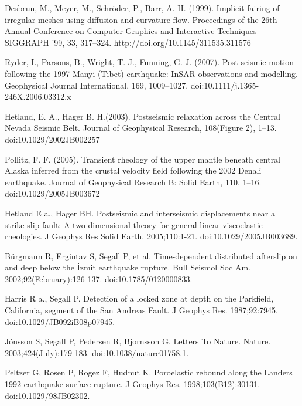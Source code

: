\documentclass[12pt]{article}
\begin{document}
\begin{thebibliography}{}

Desbrun, M., Meyer, M.,
  Schröder, P., Barr, A. H. (1999). Implicit fairing of irregular
  meshes using diffusion and curvature flow. Proceedings of the 26th
  Annual Conference on Computer Graphics and Interactive Techniques -
  SIGGRAPH ’99, 33, 317–324. http://doi.org/10.1145/311535.311576

Ryder, I., Parsons, B.,
  Wright, T. J., Funning, G. J. (2007). Post-seismic motion
  following the 1997 Manyi (Tibet) earthquake: InSAR observations and
  modelling. Geophysical Journal International, 169,
  1009–1027. doi:10.1111/j.1365-246X.2006.03312.x

Hetland, E. A.,
  Hager B. H.(2003). Postseismic relaxation across the Central Nevada
  Seismic Belt. Journal of Geophysical Research, 108(Figure 2),
  1–13. doi:10.1029/2002JB002257

Pollitz,
  F. F. (2005). Transient rheology of the upper mantle beneath central
  Alaska inferred from the crustal velocity field following the 2002
  Denali earthquake. Journal of Geophysical Research B: Solid Earth,
  110, 1–16. doi:10.1029/2005JB003672

 Hetland E a., Hager
  BH. Postseismic and interseismic displacements near a strike-slip
  fault: A two-dimensional theory for general linear viscoelastic
  rheologies. J Geophys Res Solid
  Earth. 2005;110:1-21. doi:10.1029/2005JB003689.

 B\"{u}rgmann R,
  Ergintav S, Segall P, et al. Time-dependent distributed afterslip on
  and deep below the İzmit earthquake rupture. Bull Seismol Soc
  Am. 2002;92(February):126-137. doi:10.1785/0120000833.

 Harris R a., Segall
  P. Detection of a locked zone at depth on the Parkfield, California,
  segment of the San Andreas Fault. J Geophys
  Res. 1987;92:7945. doi:10.1029/JB092iB08p07945.

 J\'onsson S, Segall P, Pedersen
  R, Bjornsson G. Letters To
  Nature. Nature. 2003;424(July):179-183. doi:10.1038/nature01758.1.

 Peltzer G, Rosen P,
  Rogez F, Hudnut K. Poroelastic rebound along the Landers 1992
  earthquake surface rupture. J Geophys
  Res. 1998;103(B12):30131. doi:10.1029/98JB02302.


\end{thebibliography}
\end{document}
